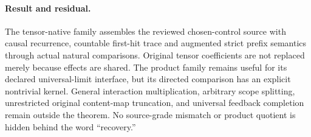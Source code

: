 \documentclass[11pt]{article}
\begin{document}
\paragraph{Result and residual.}
The tensor-native family assembles the reviewed chosen-control source with causal recurrence, countable first-hit trace and augmented strict prefix semantics through actual natural comparisons. Original tensor coefficients are not replaced merely because effects are shared. The product family remains useful for its declared universal-limit interface, but its directed comparison has an explicit nontrivial kernel. General interaction multiplication, arbitrary scope splitting, unrestricted original content-map truncation, and universal feedback completion remain outside the theorem. No source-grade mismatch or product quotient is hidden behind the word ``recovery.''
\end{document}
